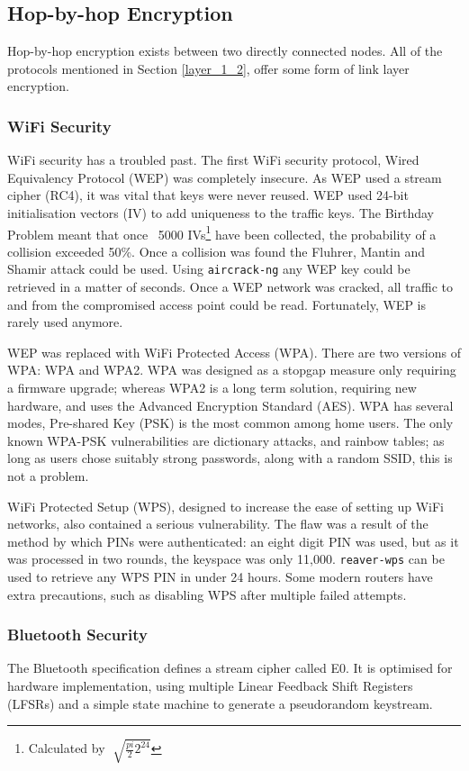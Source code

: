 \documentclass[10pt,journal,compsoc]{IEEEtran}
\begin{document}
\subsection{Hop-by-hop Encryption}
Hop-by-hop encryption exists between two directly connected nodes. All of the
protocols mentioned in Section \ref{layer_1_2}, offer some form of link layer
encryption. 

\subsubsection{WiFi Security}
WiFi security has a troubled past. The first WiFi security protocol, Wired
Equivalency Protocol (WEP) was completely insecure. As WEP used a stream cipher
(RC4), it was vital that keys were never reused. WEP used 24-bit initialisation
vectors (IV) to add uniqueness to the traffic keys. The Birthday Problem meant
that once ~5000 IVs\footnote{Calculated by $\sqrt[]{\frac{pi}{2} 2^{24}} $}
have been collected, the probability of a collision exceeded 50\%.  Once a
collision was found the Fluhrer, Mantin and Shamir attack could be used.  Using
{\tt aircrack-ng} any WEP key could be retrieved in a matter of seconds. Once a
WEP network was cracked, all traffic to and from the compromised access point
could be read. Fortunately, WEP is rarely used anymore.

WEP was replaced with WiFi Protected Access (WPA). There are two versions of
WPA: WPA and WPA2. WPA was designed as a stopgap measure only requiring a
firmware upgrade; whereas WPA2 is a long term solution, requiring new hardware,
and uses the Advanced Encryption Standard (AES). WPA has several modes, Pre-shared
Key (PSK) is the most common among home users. The only known WPA-PSK
vulnerabilities are dictionary attacks, and rainbow tables; as long as users
chose suitably strong passwords, along with a random SSID, this is not a
problem. 

WiFi Protected Setup (WPS), designed to increase the ease of setting up WiFi
networks, also contained a serious vulnerability. The flaw was a result of the
method by which PINs were authenticated: an eight digit PIN was used, but as it
was processed in two rounds, the keyspace was only 11,000. {\tt reaver-wps} can
be used to retrieve any WPS PIN in under 24 hours. Some modern routers have
extra precautions, such as disabling WPS after multiple failed attempts. 

\subsubsection{Bluetooth Security}
The Bluetooth specification \cite{BTSpec} defines a stream cipher called E0.
It is optimised for  hardware implementation, using multiple Linear Feedback
Shift Registers (LFSRs) and a simple state machine to generate a pseudorandom
keystream. 
\end{document}

